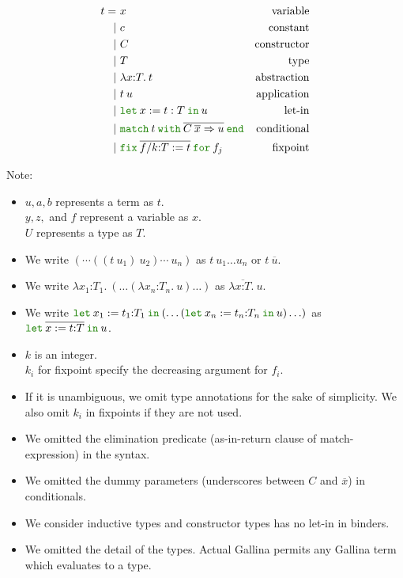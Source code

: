 \documentclass[a4paper,fleqn]{article}
\def\gallina{\textrm{Gallina}}
\newcommand{\kwlet}{\mbox{\color{mygreen}\ttfamily let}}
\newcommand{\kwin}{\mbox{\color{mygreen}\ttfamily in}}
\newcommand{\kwmatch}{\mbox{\color{mygreen}\ttfamily match}}
\newcommand{\kwas}{\mbox{\color{mygreen}\ttfamily as}}
\newcommand{\kwreturn}{\mbox{\color{mygreen}\ttfamily return}}
\newcommand{\kwwith}{\mbox{\color{mygreen}\ttfamily with}}
\newcommand{\kwend}{\mbox{\color{mygreen}\ttfamily end}}
\newcommand{\kwfix}{\mbox{\color{mygreen}\ttfamily fix}}
\newcommand{\kwfor}{\mbox{\color{mygreen}\ttfamily for}}
\newcommand{\lamT}[3]{\lambda #1\mathord{:}#2.\:#3}
\newcommand{\lamTM}[3]{\lambda \rep{#1\mathord{:}#2}.\:#3}
\newcommand{\letin}[3]{\kwlet\:#1:=#2\:\kwin\:#3}
\newcommand{\letinM}[3]{\kwlet\:\rep{#1:=#2}\:\kwin\:#3}
\newcommand{\omatch}[2]{\kwmatch\:#1\:\kwwith\:{#2}\:\kwend}
\newcommand{\ofix}[2]{\kwfix\:{#1}\:\kwfor\:{#2}}
\newcommand{\rep}[1]{\overline{#1}}
\begin{document}
\begin{align*}
  t =&\ x & \text{variable} \\
    |&\ c & \text{constant} \\
    |&\ C & \text{constructor} \\
    |&\ T & \text{type} \\
    |&\ \lamT{x}{T}{t}        & \text{abstraction} \\
    |&\ t\:u                  & \text{application} \\
    |&\ \letin{x}{t:T}{u}     & \text{let-in} \\
    |&\ \omatch{t}{\overline{C\:\overline{x}\Rightarrow u}} & \text{conditional} \\
    |&\ \ofix{\overline{f/k{:}T:=t}}{f_j} & \text{fixpoint}
\end{align*}
{\small Note:
\begin{itemize}
  \item $u, a, b$ represents a term as $t$. \\ $y, z,$ and $f$ represent a variable as $x$. \\ $U$ represents a type as $T$.
  \item We write $(\cdots((t\:u_1)\:u_2)\cdots\:u_n)$ as $t\:u_1\ldots u_n$ or $t\:\rep{u}$.
  \item We write $\lamT{x_1}{T_1}{(\ldots (\lamT{x_n}{T_n}{u}) \ldots)}$ as $\lamTM{x}{T}{u}$.
  \item We write $\letin{x_1}{t_1{:}T_1}{(\ldots(\letin{x_n}{t_n{:}T_n}{u})\ldots)}$ as $\letinM{x}{t{:}T}{u}$.
  \item $k$ is an integer. \\ $k_i$ for fixpoint specify the decreasing argument for $f_i$.
  \item If it is unambiguous, we omit type annotations for the sake of simplicity.  We also omit $k_i$ in fixpoints if they are not used.
  \item We omitted the elimination predicate (\kwas-\kwin-\kwreturn{} clause of \kwmatch-expression) in the syntax.
  \item We omitted the dummy parameters (underscores between $C$ and $\overline{x}$) in conditionals.
  \item We consider inductive types and constructor types has no let-in in binders.
  \item We omitted the detail of the types.  Actual \gallina{} permits any \gallina{} term which evaluates to a type.
\end{itemize}}
\end{document}
